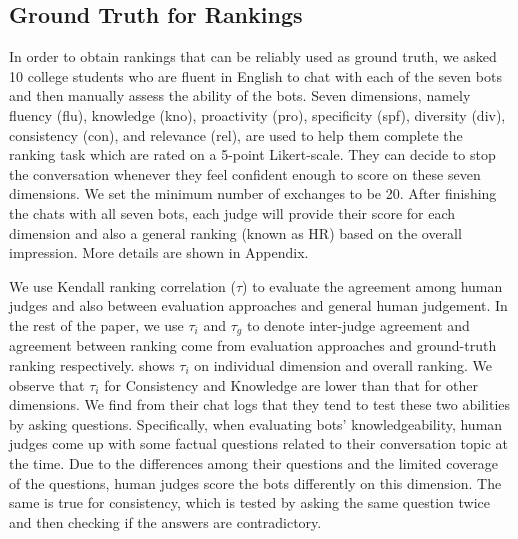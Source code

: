 

\subsection{Ground Truth for Rankings}
 In order to obtain rankings that can be reliably used as ground truth, 
we asked 10 college students who are fluent in English to chat 
with each of the seven bots and then manually assess the ability of 
the bots. Seven dimensions, namely fluency (flu), 
knowledge (kno), proactivity (pro), specificity (spf), 
diversity (div), consistency (con), and relevance (rel), 
are used to help them complete the ranking task 
which are rated on a 5-point Likert-scale. They can decide to 
stop the conversation whenever they feel confident enough to score
on these seven dimensions. We set the minimum number of exchanges
to be 20. After finishing the chats with all seven bots,  
each judge will provide their score for each dimension
 and also a general ranking  (known as HR) based on the overall impression.
More details are shown in Appendix.

We use Kendall ranking correlation ($\tau$) to evaluate the agreement 
among human judges and also between evaluation approaches and 
general human judgement. 
In the rest of the paper,
we use $\tau_{i}$ and $\tau_{g}$ to denote inter-judge agreement and
 agreement between ranking come from evaluation approaches and ground-truth
ranking respectively.  
 shows $\tau_i$ on individual dimension and overall ranking. 
We observe that $\tau_i$ for Consistency and Knowledge are lower than 
that for other dimensions.
 We find from their
chat logs 
 that they tend to test these two abilities
 by asking questions. 
Specifically, when evaluating bots' knowledgeability, 
human judges come up with some factual questions 
related to their conversation topic at the time.
Due to the differences among their questions and 
the limited coverage of the questions, 
human judges score the bots differently on this dimension. 
The same is true for consistency, which is tested by asking the same question twice and then checking if the answers are contradictory.     


